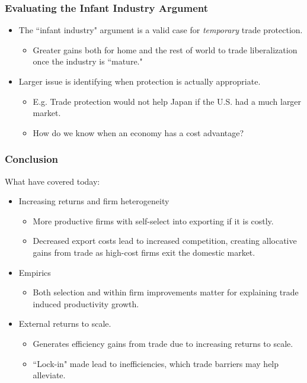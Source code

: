 \documentclass{beamer}
\begin{document}
\begin{frame}
	\frametitle{Evaluating the Infant Industry Argument}
\begin{itemize}
	\item The ``infant industry" argument is a valid case for \emph{temporary} trade protection.
		\begin{itemize}
			\item Greater gains both for home and the rest of world to trade liberalization once the industry is ``mature."
		\end{itemize}
			\item Larger issue is identifying when protection is actually appropriate.
				\begin{itemize}
			\item E.g. Trade protection would not help Japan if the U.S. had a much larger market. 
			\item How do we know when an economy has a cost advantage?
				\end{itemize}
\end{itemize}
\end{frame}


\begin{frame}
	\frametitle{Conclusion}
What have covered today:
\begin{itemize}
	\item Increasing returns and firm heterogeneity
		\begin{itemize}
			\item More productive firms with self-select into exporting if it is costly.
			\item Decreased export costs lead to increased competition, creating allocative gains from trade as high-cost firms exit the domestic market.
		\end{itemize}
	\item Empirics
		\begin{itemize}
			\item Both selection and within firm improvements matter for explaining trade induced productivity growth.
		\end{itemize}
	\item External returns to scale. 
		\begin{itemize}
			\item Generates efficiency gains from trade due to increasing returns to scale.
			\item ``Lock-in" made lead to inefficiencies, which trade barriers may help alleviate. 
		\end{itemize}
	
\end{itemize}
\end{frame}
\end{document}
